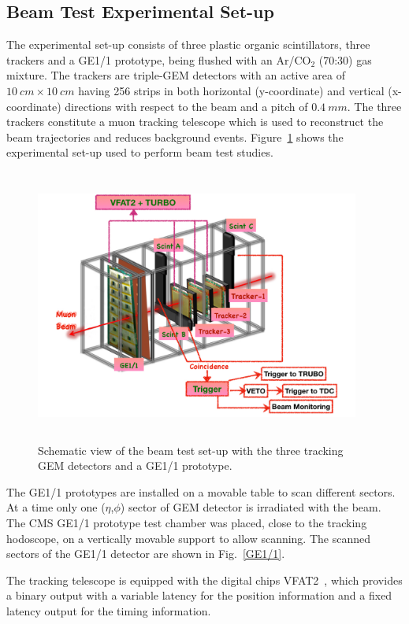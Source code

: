 \subsection{Beam Test Experimental Set-up}
The experimental set-up consists of three plastic organic scintillators, three trackers and a GE1/1 prototype, being flushed with an Ar/CO$_{2}$ (70:30) gas mixture.
The trackers are triple-GEM detectors with an active area of $10~cm\times10~cm$ having 256 strips in both horizontal (y-coordinate) and vertical (x-coordinate) directions with respect to the beam and a pitch of $0.4~mm$.
The three trackers constitute a muon tracking telescope which is used to reconstruct the beam trajectories and reduces background events.
Figure~\ref{fig:daq} shows the experimental set-up used to perform beam test studies.
\begin{figure}[!htbp]
\centering
\includegraphics[width=0.95\textwidth,height=9cm]{figures/GEM/test_beam_setup.pdf}
\caption{Schematic view of the beam test set-up with the three tracking GEM detectors and a GE1/1 prototype.}
\label{fig:daq}
\end{figure}
The GE1/1 prototypes are installed on a movable table to scan different sectors.
At a time only one ($\eta$,$\phi$) sector of GEM detector is irradiated with the beam.
The CMS GE1/1 prototype test chamber was placed, close to the tracking hodoscope, on a vertically movable support to allow scanning. The scanned sectors of the GE1/1 detector are shown in Fig.~\ref{GE1/1}.

The tracking telescope is equipped with the digital chips VFAT2~\cite{Aspell:2008zz}, which provides a binary output with a variable latency for the position information and a fixed latency output for the timing information.

